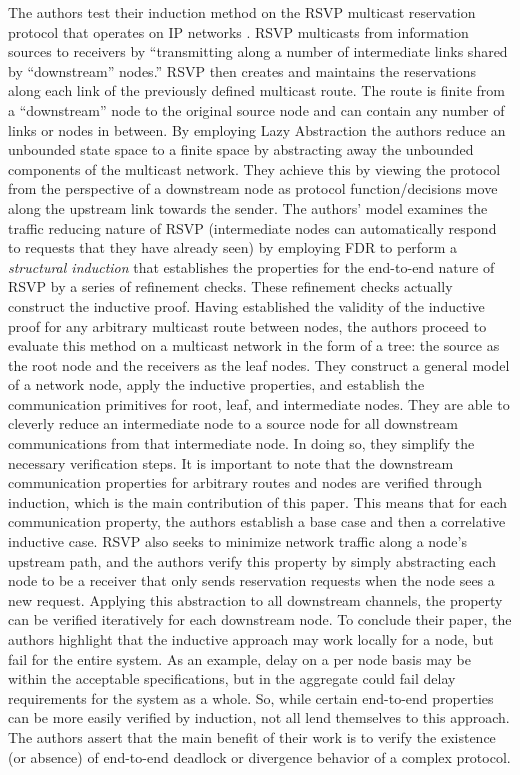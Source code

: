 \documentclass[11pt, journal]{IEEEtran}
\begin{document}
\bigbreak
The authors test their induction method on the RSVP multicast reservation protocol that operates on IP networks \cite{rfc2205}. RSVP multicasts from information sources to receivers by ``transmitting along a number of intermediate links shared by ``downstream'' nodes.'' RSVP then creates and maintains the reservations along each link of the previously defined multicast route. The route is finite from a ``downstream'' node to the original source node and can contain any number of links or nodes in between.
\bigbreak
By employing Lazy Abstraction the authors reduce an unbounded state space to a finite space by abstracting away the unbounded components of the multicast network. They achieve this by viewing the protocol from the perspective of a downstream node as protocol function/decisions move along the upstream link towards the sender.
\bigbreak
The authors' model examines the traffic reducing nature of RSVP (intermediate nodes can automatically respond to requests that they have already seen) by employing FDR to perform a \textit{structural induction} that establishes the properties for the end-to-end nature of RSVP by a series of refinement checks. These refinement checks actually construct the inductive proof. Having established the validity of the inductive proof for any arbitrary multicast route between nodes, the authors proceed to evaluate this method on a multicast network in the form of a tree: the source as the root node and the receivers as the leaf nodes. They construct a general model of a network node, apply the inductive properties, and establish the communication primitives for root, leaf, and intermediate nodes. They are able to cleverly reduce an intermediate node to a source node for all downstream communications from that intermediate node. In doing so, they simplify the necessary verification steps. It is important to note that the downstream communication properties for arbitrary routes and nodes are verified through induction, which is the main contribution of this paper. This means that for each communication property, the authors establish a base case and then a correlative inductive case. RSVP also seeks to minimize network traffic along a node's upstream path, and the authors verify this property by simply abstracting each node to be a receiver that only sends reservation requests when the node sees a new request. Applying this abstraction to all downstream channels, the property can be verified iteratively for each downstream node. 
\bigbreak
To conclude their paper, the authors highlight that the inductive approach may work locally for a node, but fail for the entire system. As an example, delay on a per node basis may be within the acceptable specifications, but in the aggregate could fail delay requirements for the system as a whole. So, while certain end-to-end properties can be more easily verified by induction, not all lend themselves to this approach. The authors assert that the main benefit of their work is to verify the existence (or absence) of end-to-end deadlock or divergence behavior of a complex protocol. 
\end{document}
